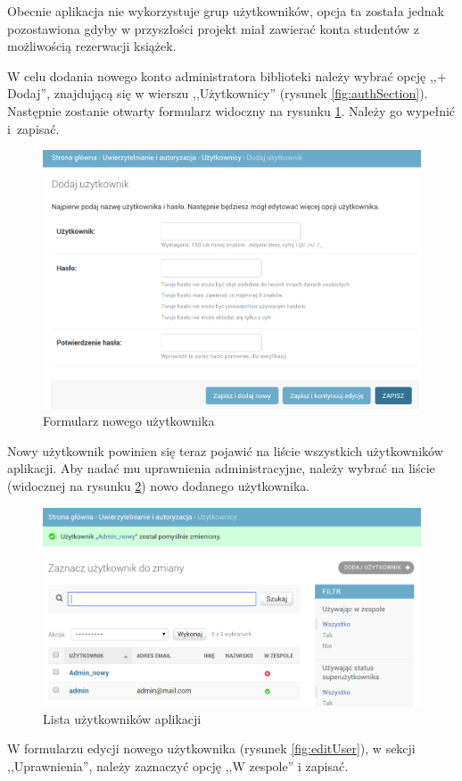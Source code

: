 \documentclass[twoside]{projektInzynierskiMS}
\begin{document}
Obecnie aplikacja nie wykorzystuje grup użytkowników, opcja ta została jednak pozostawiona gdyby w przyszłości projekt miał zawierać konta studentów z możliwością rezerwacji książek.
 
W celu dodania nowego konto administratora biblioteki należy wybrać opcję ,,+ Dodaj'', znajdującą się w wierszu ,,Użytkownicy'' (rysunek \ref{fig:authSection}). Następnie zostanie otwarty formularz widoczny na rysunku \ref{fig:newUserForm}. Należy go wypełnić i~zapisać.

\begin{figure}[h]
  \centering
  \includegraphics[width=0.6\linewidth]{img/backend/NowyAdminForm.png}
  \caption{Formularz nowego użytkownika}
  \label{fig:newUserForm}
\end{figure}

Nowy użytkownik powinien się teraz pojawić na liście wszystkich użytkowników aplikacji. Aby nadać mu uprawnienia administracyjne, należy wybrać na liście (widocznej na rysunku \ref{fig:usersList}) nowo dodanego użytkownika.

\begin{figure}[h]
  \centering
  \includegraphics[width=0.6\linewidth]{img/backend/ListaUser.png}
  \caption{Lista użytkowników aplikacji}
  \label{fig:usersList}
\end{figure}

W formularzu edycji nowego użytkownika (rysunek \ref{fig:editUser}), w sekcji ,,Uprawnienia'', należy zaznaczyć opcję ,,W zespole'' i zapisać.
\end{document}
